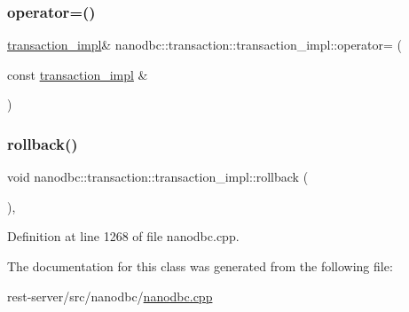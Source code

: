 \subsubsection{\texorpdfstring{operator=()}{operator=()}}
{\footnotesize\ttfamily \mbox{\hyperlink{classnanodbc_1_1transaction_1_1transaction__impl}{transaction\+\_\+impl}}\& nanodbc\+::transaction\+::transaction\+\_\+impl\+::operator= (\begin{DoxyParamCaption}\item[{const \mbox{\hyperlink{classnanodbc_1_1transaction_1_1transaction__impl}{transaction\+\_\+impl}} \&}]{ }\end{DoxyParamCaption})\hspace{0.3cm}{\ttfamily [delete]}}

\mbox{\label{classnanodbc_1_1transaction_1_1transaction__impl_acfd5581e2b513c9f61666fa6a7098ed6}} 
\subsubsection{\texorpdfstring{rollback()}{rollback()}}
{\footnotesize\ttfamily void nanodbc\+::transaction\+::transaction\+\_\+impl\+::rollback (\begin{DoxyParamCaption}{ }\end{DoxyParamCaption})\hspace{0.3cm}{\ttfamily [inline]}, {\ttfamily [noexcept]}}



Definition at line 1268 of file nanodbc.\+cpp.



The documentation for this class was generated from the following file\+:\begin{DoxyCompactItemize}
\item 
rest-\/server/src/nanodbc/\mbox{\hyperlink{nanodbc_8cpp}{nanodbc.\+cpp}}\end{DoxyCompactItemize}
